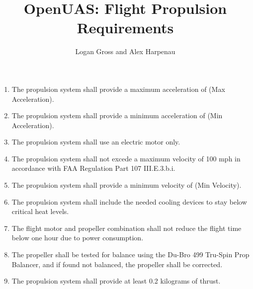 \documentclass{article}
\begin{document}
\title{OpenUAS: Flight Propulsion Requirements}

\author{Logan Gross and Alex Harpenau}

\maketitle

\begin{enumerate}

\item The propulsion system shall provide a maximum acceleration of (Max Acceleration).\\

\item The propulsion system shall provide a minimum acceleration of (Min Acceleration).\\

\item The propulsion system shall use an electric motor only.\\

\item The propulsion system shall not excede a maximum velocity of 100 mph in accordance with FAA Regulation Part 107 III.E.3.b.i.\\

\item The propulsion system shall provide a minimum velocity of (Min Velocity).\\

\item The propulsion system shall include the needed cooling devices to stay below critical heat levels.\\

\item The flight motor and propeller combination shall not reduce the flight time below one hour due to power consumption.\\

\item The propeller shall be tested for balance using the Du-Bro 499 Tru-Spin Prop Balancer, and if found not balanced, the propeller shall be corrected.\\

\item The propulsion system shall provide at least 0.2 kilograms of thrust.\\

\end{enumerate}
\end{document}
